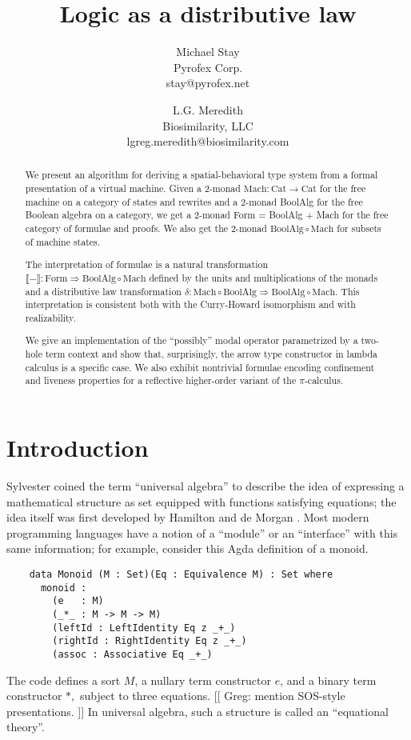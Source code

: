 \documentclass{article}
\title{Logic as a distributive law}
\author{
Michael Stay\\
  {Pyrofex Corp.}\\
  {\fontsize{8}{8}\selectfont stay@pyrofex.net}
\and
L.G. Meredith\\
  {Biosimilarity, LLC}\\
  {\fontsize{8}{8}\selectfont lgreg.meredith@biosimilarity.com}
}
\newcommand{\interp}[1]{\llbracket #1 \rrbracket}
\newcommand{\maps}{\colon}
\newcommand{\Cat}{\mathrm{Cat}}
\newcommand{\Mach}{\mathrm{Mach}}
\newcommand{\BoolAlg}{\mathrm{BoolAlg}}
\newcommand{\Form}{\mathrm{Form}}
\begin{document}
\maketitle
\begin{abstract}
\noindent
  We present an algorithm for deriving a spatial-behavioral type system from a formal presentation of a virtual machine.  Given a 2-monad $\Mach\maps \Cat \to \Cat$ for the free machine on a category of states and rewrites and a 2-monad BoolAlg for the free Boolean algebra on a category, we get a 2-monad Form = BoolAlg + Mach for the free category of formulae and proofs.  We also get the 2-monad $\BoolAlg \circ \Mach$ for subsets of machine states. 

  The interpretation of formulae is a natural transformation $\interp{-} \maps \Form \Rightarrow \BoolAlg \circ \Mach$ defined by the units and multiplications of the monads and a distributive law transformation $\delta\maps \Mach \circ \BoolAlg \Rightarrow \BoolAlg \circ \Mach.$  This interpretation is consistent both with the Curry-Howard isomorphism and with realizability.

  We give an implementation of the ``possibly'' modal operator parametrized by a two-hole term context and show that, surprisingly, the arrow type constructor in lambda calculus is a specific case.  We also exhibit nontrivial formulae encoding confinement and liveness properties for a reflective higher-order variant of the $\pi$-calculus.

\end{abstract}
\section{Introduction}

  Sylvester coined the term ``universal algebra'' to describe the idea of expressing a mathematical structure as set equipped with functions satisfying equations; the idea itself was first developed by Hamilton and de Morgan \cite{Whitehead}.  Most modern programming languages have a notion of a ``module'' or an ``interface'' with this same information; for example, consider this Agda definition of a monoid.
  \begin{verbatim}
    data Monoid (M : Set)(Eq : Equivalence M) : Set where
      monoid :
        (e   : M)
        (_*_ : M -> M -> M)
        (leftId : LeftIdentity Eq z _+_)
        (rightId : RightIdentity Eq z _+_)
        (assoc : Associative Eq _+_)
  \end{verbatim}
  The code defines a sort $M$, a nullary term constructor $e$, and a binary term constructor $*,$ subject to three equations.  [[ Greg: mention SOS-style presentations. ]] In universal algebra, such a structure is called an ``equational theory''.  
\end{document}
